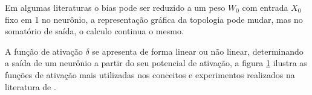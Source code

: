             \begin{figure}[H]
            \end{figure}
			
		     Em algumas literaturas o bias pode ser reduzido a um peso $W_0$ com entrada $X_0$ fixo em 1 no neurônio, a representação gráfica da topologia pode mudar, mas no somatório de saída, o calculo continua o mesmo.
		
		     A função de ativação $\delta$ se apresenta de forma linear ou não linear, determinando a saída de um neurônio a partir do seu potencial de ativação, a figura \ref{fig:activation_functions} ilustra as funções de ativação mais utilizadas nos conceitos e experimentos realizados na literatura de \cite{MCAI}.
		
		     \begin{figure}[H]
        	 \label{fig:activation_functions}
        \end{figure}
		
